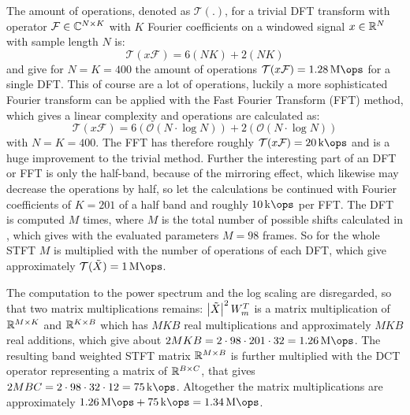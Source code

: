 The amount of operations, denoted as $\mathcal{T(.)}$, for a trivial DFT transform with operator $\mathcal{F} \in \mathbb{C}^{N \times K}$ with $K$ Fourier coefficients on a windowed signal $x \in \mathbb{R}^N$ with sample length $N$ is:
\begin{equation}
  \mathcal{T}(x\mathcal{F}) = 6 (N K) + 2 (N K)
\end{equation}
and give for $N = K = 400$ the amount of operations $\mathcal{T}(x\mathcal{F}) = \SI{1.28}{\mega\ops}$ for a single DFT.
This of course are a lot of operations, luckily a more sophisticated Fourier transform can be applied with the Fast Fourier Transform (FFT) method, which gives a linear complexity and operations are calculated as:
\begin{equation}
  \mathcal{T}(x\mathcal{F}) = 6 (\mathcal{O}(N \cdot \log N)) + 2 (\mathcal{O}(N \cdot \log N))
\end{equation}
with $N = K = 400$.
The FFT has therefore roughly $\mathcal{T}(x\mathcal{F}) = \SI{20}{\kilo\ops}$ and is a huge improvement to the trivial method.
Further the interesting part of an DFT or FFT is only the half-band, because of the mirroring effect, which likewise may decrease the operations by half, so let the calculations be continued with Fourier coefficients of $K = 201$ of a half band and roughly $\SI{10}{\kilo\ops}$ per FFT.
The DFT is computed $M$ times, where $M$ is the total number of possible shifts calculated in , which gives with the evaluated parameters $M = 98$ frames.
So for the whole STFT $M$ is multiplied with the number of operations of each DFT, which give approximately $\mathcal{T}(\tilde{X}) = \SI{1}{\mega\ops}$.

The computation to the power spectrum and the log scaling are disregarded, so that two matrix multiplications remains:
$\abs{\tilde{X}}^2 \, W_m^T$ is a matrix multiplication of $\mathbb{R}^{M \times K}$ and $\mathbb{R}^{K \times B}$ which has $M K B$ real multiplications and approximately $M K B$ real additions, which give about $2 M K B = 2 \cdot 98 \cdot 201 \cdot 32 =  \SI{1.26}{\mega\ops}$.
The resulting band weighted STFT matrix $\mathbb{R}^{M \times B}$ is further multiplied with the DCT operator representing a matrix of $\mathbb{R}^{B \times C}$, that gives $2 M B C = 2 \cdot 98 \cdot 32 \cdot 12 = \SI{75}{\kilo\ops}$.
Altogether the matrix multiplications are approximately $\SI{1.26}{\mega\ops} + \SI{75}{\kilo\ops} = \SI{1.34}{\mega\ops}$.

